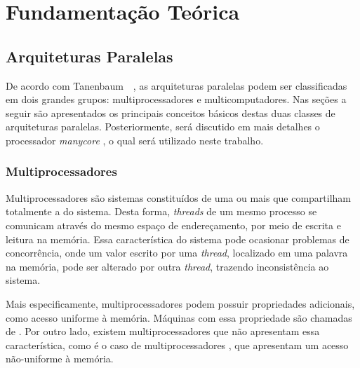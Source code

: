\chapter{Fundamentação Teórica}
\label{cha:fundTeorica}

\section{Arquiteturas Paralelas}

De acordo com Tanenbaum~\etal~\cite{Tanenbaum2015}, as arquiteturas paralelas podem ser classificadas em
dois grandes grupos: multiprocessadores e multicomputadores. Nas seções a seguir são apresentados os
principais conceitos básicos destas duas classes de arquiteturas paralelas. Posteriormente, será discutido
em mais detalhes o processador \textit{manycore} \mppa, o qual será utilizado neste trabalho.


\subsection{Multiprocessadores}




Multiprocessadores são sistemas constituídos de uma ou mais \cpus que
compartilham totalmente
a \ram do sistema. Desta forma, \textit{threads} de um mesmo processo se
comunicam através do mesmo espaço de endereçamento, por meio de escrita e
leitura na memória. Essa característica do sistema pode ocasionar problemas de
concorrência, onde um valor escrito por uma \textit{thread}, localizado em uma
palavra na memória, pode ser alterado por outra \textit{thread}, trazendo
inconsistência ao sistema.

Mais especificamente, multiprocessadores podem possuir propriedades adicionais,
como acesso uniforme à memória. Máquinas com essa propriedade são chamadas de
\uma. Por outro lado, existem multiprocessadores que não apresentam essa
característica, como é o caso de multiprocessadores \numa, que apresentam um acesso
não-uniforme à memória.

